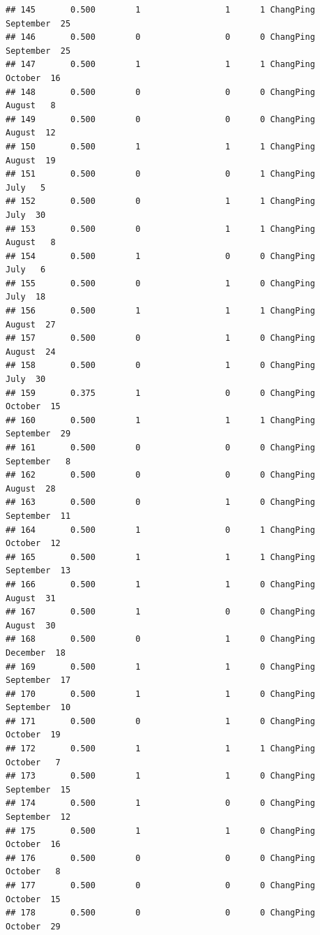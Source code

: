 \documentclass[
]{article}
\begin{document}
\begin{verbatim}
## 145       0.500        1                 1      1 ChangPing September  25
## 146       0.500        0                 0      0 ChangPing September  25
## 147       0.500        1                 1      1 ChangPing   October  16
## 148       0.500        0                 0      0 ChangPing    August   8
## 149       0.500        0                 0      0 ChangPing    August  12
## 150       0.500        1                 1      1 ChangPing    August  19
## 151       0.500        0                 0      1 ChangPing      July   5
## 152       0.500        0                 1      1 ChangPing      July  30
## 153       0.500        0                 1      1 ChangPing    August   8
## 154       0.500        1                 0      0 ChangPing      July   6
## 155       0.500        0                 1      0 ChangPing      July  18
## 156       0.500        1                 1      1 ChangPing    August  27
## 157       0.500        0                 1      0 ChangPing    August  24
## 158       0.500        0                 1      0 ChangPing      July  30
## 159       0.375        1                 0      0 ChangPing   October  15
## 160       0.500        1                 1      1 ChangPing September  29
## 161       0.500        0                 0      0 ChangPing September   8
## 162       0.500        0                 0      0 ChangPing    August  28
## 163       0.500        0                 1      0 ChangPing September  11
## 164       0.500        1                 0      1 ChangPing   October  12
## 165       0.500        1                 1      1 ChangPing September  13
## 166       0.500        1                 1      0 ChangPing    August  31
## 167       0.500        1                 0      0 ChangPing    August  30
## 168       0.500        0                 1      0 ChangPing  December  18
## 169       0.500        1                 1      0 ChangPing September  17
## 170       0.500        1                 1      0 ChangPing September  10
## 171       0.500        0                 1      0 ChangPing   October  19
## 172       0.500        1                 1      1 ChangPing   October   7
## 173       0.500        1                 1      0 ChangPing September  15
## 174       0.500        1                 0      0 ChangPing September  12
## 175       0.500        1                 1      0 ChangPing   October  16
## 176       0.500        0                 0      0 ChangPing   October   8
## 177       0.500        0                 0      0 ChangPing   October  15
## 178       0.500        0                 0      0 ChangPing   October  29

\end{verbatim}
\end{document}
